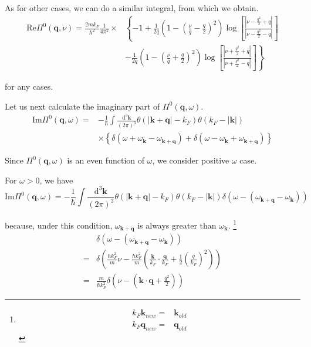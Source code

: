As for other cases, we can do a similar integral, from which we obtain.
\begin{equation} \label{Eqs2.8.20}
\begin{split}\text{Re} \Pi^0(\mathbf{q},\nu)
= \frac{2 m k_F}{\hbar^2} \frac{1}{4\pi^2} \times&\left\{ -1 + \frac{1}{2q}\left( 1-(\frac{\nu}{q}-\frac{q}{2})^2 \right) \log\left[ \frac{|\nu-\frac{q^2}{2}+q|}{|\nu-\frac{q^2}{2}-q|} \right] \right. \\
&\left. -\frac{1}{2q}\left( 1-(\frac{\nu}{q}+\frac{q}{2})^2 \right) \log\left[ \frac{|\nu+\frac{q^2}{2}+q|}{|\nu+\frac{q^2}{2}-q|} \right] \right\}
\end{split}
\end{equation}

for any cases.

Let us next calculate the imaginary part of $\Pi^0(\mathbf{q},\omega)$.
\begin{equation*} \tag{2.8.16} \begin{split}
\text{Im} \Pi^0(\mathbf{q},\omega) =& -\frac{1}{\hbar} \int \frac{\mathrm{d}^3 \mathbf{k}}{(2\pi)^3} \theta(|\mathbf{k}+\mathbf{q}|-k_F)\theta(k_F - |\mathbf{k}|)\\
& \times \left\{ \delta(\omega+\omega_{\mathbf{k}}- \omega_{\mathbf{k}+\mathbf{q}}) + \delta(\omega-\omega_{\mathbf{k}}+ \omega_{\mathbf{k}+\mathbf{q}}) \right\}
\end{split}\end{equation*}

Since $\Pi^0(\mathbf{q},\omega)$ is an even function of $\omega$, we consider positive $\omega$ case.

For $\omega > 0$, we have
\[
\text{Im} \Pi^0(\mathbf{q},\omega) = -\frac{1}{\hbar} \int \frac{\mathrm{d}^3 \mathbf{k}}{(2\pi)^3} \theta(|\mathbf{k}+\mathbf{q}|-k_F)\theta(k_F - |\mathbf{k}|) \delta(\omega-(\omega_{\mathbf{k}+\mathbf{q}} - \omega_{\mathbf{k}}))
\]

because, under this condition, $\omega_{\mathbf{k}+\mathbf{q}}$ is always greater than $\omega_{\mathbf{k}}$.
\footnote{\[\begin{split}k_F\mathbf{k}_{new} =& \mathbf{k}_{old}\\
k_F \mathbf{q}_{new} =& \mathbf{q}_{old}\end{split}\]}
\[\begin{split} &\delta(\omega - (\omega_{\mathbf{k}+\mathbf{q}} - \omega_{\mathbf{k}})) \\=& \delta(\frac{\hbar k_F^2}{m}\nu - \frac{\hbar k_F^2}{m}(\frac{\mathbf{k}}{k_F}\cdot \frac{\mathbf{q}}{k_F} + \frac{1}{2}\left( \frac{q}{k_F} \right)^2) )\\
=& \frac{m}{\hbar k_F^2} \delta(\nu - (\mathbf{k}\cdot \mathbf{q} + \frac{q^2}{2}))
\end{split}\]

